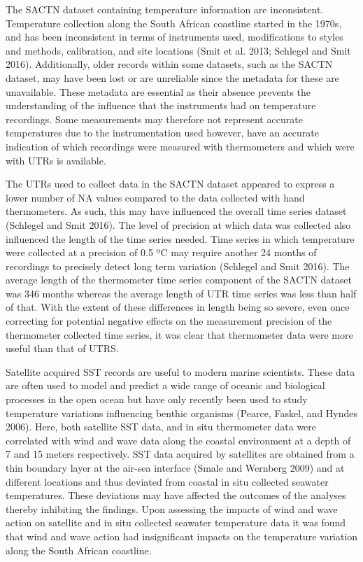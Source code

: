 \documentclass[12pt,a4paper,]{article}
\begin{document}
The SACTN dataset containing temperature information are inconsistent.
Temperature collection along the South African coastline started in the
1970s, and has been inconsistent in terms of instruments used,
modifications to styles and methods, calibration, and site locations
(Smit et al. 2013; Schlegel and Smit 2016). Additionally, older records
within some datasets, such as the SACTN dataset, may have been lost or
are unreliable since the metadata for these are unavailable. These
metadata are essential as their absence prevents the understanding of
the influence that the instruments had on temperature recordings. Some
measurements may therefore not represent accurate temperatures due to
the instrumentation used however, have an accurate indication of which
recordings were measured with thermometers and which were with UTRs is
available.

The UTRs used to collect data in the SACTN dataset appeared to express a
lower number of NA values compared to the data collected with hand
thermometers. As such, this may have influenced the overall time series
dataset (Schlegel and Smit 2016). The level of precision at which data
was collected also influenced the length of the time series needed. Time
series in which temperature were collected at a precision of 0.5 ºC may
require another 24 months of recordings to precisely detect long term
variation (Schlegel and Smit 2016). The average length of the
thermometer time series component of the SACTN dataset was 346 months
whereas the average length of UTR time series was less than half of
that. With the extent of these differences in length being so severe,
even once correcting for potential negative effects on the measurement
precision of the thermometer collected time series, it was clear that
thermometer data were more useful than that of UTRS.

Satellite acquired SST records are useful to modern marine scientists.
These data are often used to model and predict a wide range of oceanic
and biological processes in the open ocean but have only recently been
used to study temperature variations influencing benthic organisms
(Pearce, Faskel, and Hyndes 2006). Here, both satellite SST data, and in
situ thermometer data were correlated with wind and wave data along the
coastal environment at a depth of 7 and 15 meters respectively. SST data
acquired by satellites are obtained from a thin boundary layer at the
air-sea interface (Smale and Wernberg 2009) and at different locations
and thus deviated from coastal in situ collected seawater temperatures.
These deviations may have affected the outcomes of the analyses thereby
inhibiting the findings. Upon assessing the impacts of wind and wave
action on satellite and in situ collected seawater temperature data it
was found that wind and wave action had insignificant impacts on the
temperature variation along the South African coastline.
\end{document}
